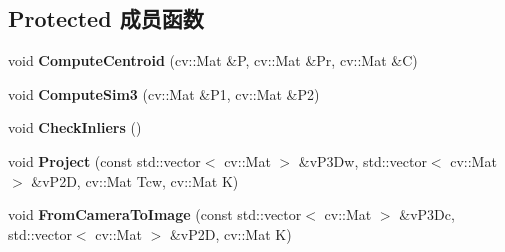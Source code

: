 \subsection*{Protected 成员函数}
\begin{DoxyCompactItemize}
\item 
\hypertarget{classORB__SLAM2_1_1Sim3Solver_aad8da5d1d78fcd8d6511ad29d9cb6db5}{void {\bfseries Compute\-Centroid} (cv\-::\-Mat \&P, cv\-::\-Mat \&Pr, cv\-::\-Mat \&C)}\label{classORB__SLAM2_1_1Sim3Solver_aad8da5d1d78fcd8d6511ad29d9cb6db5}

\item 
\hypertarget{classORB__SLAM2_1_1Sim3Solver_a87ee2729feee5729397c650b26927a8f}{void {\bfseries Compute\-Sim3} (cv\-::\-Mat \&P1, cv\-::\-Mat \&P2)}\label{classORB__SLAM2_1_1Sim3Solver_a87ee2729feee5729397c650b26927a8f}

\item 
\hypertarget{classORB__SLAM2_1_1Sim3Solver_a7abb9ede799e916a5c5954c2c8da09c7}{void {\bfseries Check\-Inliers} ()}\label{classORB__SLAM2_1_1Sim3Solver_a7abb9ede799e916a5c5954c2c8da09c7}

\item 
\hypertarget{classORB__SLAM2_1_1Sim3Solver_af44c59a21d53b04ec7f867b8291dcf25}{void {\bfseries Project} (const std\-::vector$<$ cv\-::\-Mat $>$ \&v\-P3\-Dw, std\-::vector$<$ cv\-::\-Mat $>$ \&v\-P2\-D, cv\-::\-Mat Tcw, cv\-::\-Mat K)}\label{classORB__SLAM2_1_1Sim3Solver_af44c59a21d53b04ec7f867b8291dcf25}

\item 
\hypertarget{classORB__SLAM2_1_1Sim3Solver_afbe734fae65ebb9b1c9a38ebd3bacbc3}{void {\bfseries From\-Camera\-To\-Image} (const std\-::vector$<$ cv\-::\-Mat $>$ \&v\-P3\-Dc, std\-::vector$<$ cv\-::\-Mat $>$ \&v\-P2\-D, cv\-::\-Mat K)}\label{classORB__SLAM2_1_1Sim3Solver_afbe734fae65ebb9b1c9a38ebd3bacbc3}

\end{DoxyCompactItemize}
